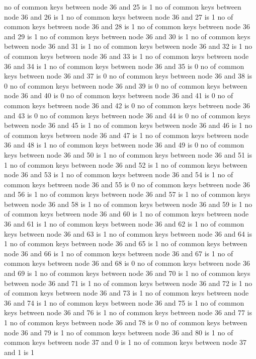 no of common keys between node 36 and 25 is 1
no of common keys between node 36 and 26 is 1
no of common keys between node 36 and 27 is 1
no of common keys between node 36 and 28 is 1
no of common keys between node 36 and 29 is 1
no of common keys between node 36 and 30 is 1
no of common keys between node 36 and 31 is 1
no of common keys between node 36 and 32 is 1
no of common keys between node 36 and 33 is 1
no of common keys between node 36 and 34 is 1
no of common keys between node 36 and 35 is 0
no of common keys between node 36 and 37 is 0
no of common keys between node 36 and 38 is 0
no of common keys between node 36 and 39 is 0
no of common keys between node 36 and 40 is 0
no of common keys between node 36 and 41 is 0
no of common keys between node 36 and 42 is 0
no of common keys between node 36 and 43 is 0
no of common keys between node 36 and 44 is 0
no of common keys between node 36 and 45 is 1
no of common keys between node 36 and 46 is 1
no of common keys between node 36 and 47 is 1
no of common keys between node 36 and 48 is 1
no of common keys between node 36 and 49 is 0
no of common keys between node 36 and 50 is 1
no of common keys between node 36 and 51 is 1
no of common keys between node 36 and 52 is 1
no of common keys between node 36 and 53 is 1
no of common keys between node 36 and 54 is 1
no of common keys between node 36 and 55 is 0
no of common keys between node 36 and 56 is 1
no of common keys between node 36 and 57 is 1
no of common keys between node 36 and 58 is 1
no of common keys between node 36 and 59 is 1
no of common keys between node 36 and 60 is 1
no of common keys between node 36 and 61 is 1
no of common keys between node 36 and 62 is 1
no of common keys between node 36 and 63 is 1
no of common keys between node 36 and 64 is 1
no of common keys between node 36 and 65 is 1
no of common keys between node 36 and 66 is 1
no of common keys between node 36 and 67 is 1
no of common keys between node 36 and 68 is 0
no of common keys between node 36 and 69 is 1
no of common keys between node 36 and 70 is 1
no of common keys between node 36 and 71 is 1
no of common keys between node 36 and 72 is 1
no of common keys between node 36 and 73 is 1
no of common keys between node 36 and 74 is 1
no of common keys between node 36 and 75 is 1
no of common keys between node 36 and 76 is 1
no of common keys between node 36 and 77 is 1
no of common keys between node 36 and 78 is 0
no of common keys between node 36 and 79 is 1
no of common keys between node 36 and 80 is 1
no of common keys between node 37 and 0 is 1
no of common keys between node 37 and 1 is 1
